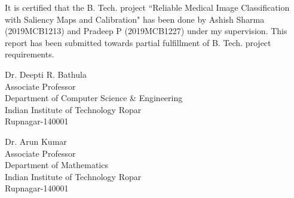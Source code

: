 


\begin{certificate}      %

It is certified that the B. Tech. project ``Reliable Medical Image Classification with Saliency Maps and Calibration" has been done by Ashish Sharma (2019MCB1213) and Pradeep P (2019MCB1227) under my supervision. 
This report has been submitted towards partial fulfillment of B. Tech. project requirements. \\



\begin{flushright}
Dr. Deepti R. Bathula \\ Associate Professor \\ Department of Computer Science \& Engineering \\ Indian Institute of Technology Ropar \\ Rupnagar-140001
\end{flushright}


\begin{flushright}
Dr. Arun Kumar \\ Associate Professor \\ Department of Mathematics \\ Indian Institute of Technology Ropar \\ Rupnagar-140001
\end{flushright}


\end{certificate}



